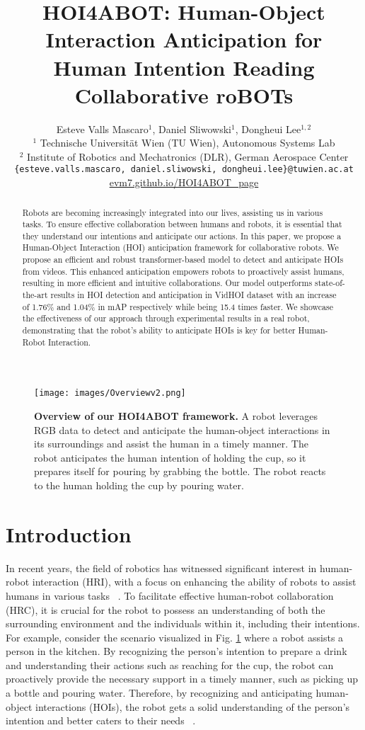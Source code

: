 \documentclass{article}
\title{HOI4ABOT: Human-Object Interaction Anticipation for Human Intention Reading Collaborative roBOTs}
\author{
Esteve Valls Mascaro$^{1}$, Daniel Sliwowski$^{1}$, Dongheui Lee$^{1,2}$\\
$^{1}$ Technische Universität Wien (TU Wien), Autonomous Systems Lab\\
$^{2}$ Institute of Robotics and Mechatronics (DLR), German Aerospace Center\\
\texttt{\{esteve.valls.mascaro, daniel.sliwowski, dongheui.lee\}@tuwien.ac.at}\\
\href{https://evm7.github.io/HOI4ABOT_page}{evm7.github.io/HOI4ABOT\_page}
}
\begin{document}
\maketitle



\begin{figure}[h!]
    \centering
    \texttt{[image: images/Overviewv2.png]}
    \caption{\textbf{Overview of our HOI4ABOT framework.} A robot leverages RGB data to detect and anticipate the human-object interactions in its surroundings and assist the human in a timely manner. The robot anticipates the human intention of holding the cup, so it prepares itself for pouring by grabbing the bottle. The robot reacts to the human holding the cup by pouring water. }
    \label{fig:Overview}
\end{figure}

\begin{abstract}
Robots are becoming increasingly integrated into our lives, assisting us in various tasks. To ensure effective collaboration between humans and robots, it is essential that they understand our intentions and anticipate our actions. In this paper, we propose a Human-Object Interaction (HOI) anticipation framework for collaborative robots. We propose an efficient and robust transformer-based model to detect and anticipate HOIs from videos.  This enhanced anticipation empowers robots to proactively assist humans, resulting in more efficient and intuitive collaborations. Our model outperforms state-of-the-art results in HOI detection and anticipation in VidHOI dataset with an increase of 1.76\% and 1.04\% in mAP respectively while being 15.4 times faster. We showcase the effectiveness of our approach through experimental results in a real robot, demonstrating that the robot's ability to anticipate HOIs is key for better Human-Robot Interaction.
\end{abstract}





\section{Introduction} In recent years, the field of robotics has witnessed significant interest in human-robot interaction (HRI), with a focus on enhancing the ability of robots to assist humans in various tasks ~\citep{hri1, hri2, hri3, Koppula2016}. To facilitate effective human-robot collaboration (HRC), it is crucial for the robot to possess an understanding of both the surrounding environment and the individuals within it, including their intentions.  For example, consider the scenario visualized in Fig. \ref{fig:Overview} where a robot assists a person in the kitchen. By recognizing the person's intention to prepare a drink and understanding their actions such as reaching for the cup, the robot can proactively provide the necessary support in a timely manner, such as picking up a bottle and pouring water. Therefore, by recognizing and anticipating human-object interactions (HOIs), the robot gets a solid understanding of the person's intention and better caters to their needs ~\citep{hri1}.
\end{document}
